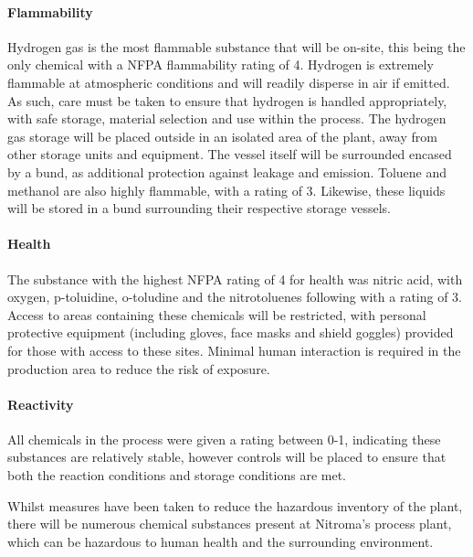 \paragraph{Flammability}

Hydrogen gas is the most flammable substance that will be on-site, this being the only chemical with a NFPA flammability rating of 4.  Hydrogen is extremely flammable at atmospheric conditions and will readily disperse in air if emitted. As such, care must be taken to ensure that hydrogen is handled appropriately, with safe storage, material selection and use within the process. The hydrogen gas storage will be placed outside in an isolated area of the plant, away from other storage units and equipment. The vessel itself will be surrounded encased by a bund, as additional protection against leakage and emission. Toluene and methanol are also highly flammable, with a rating of 3. Likewise, these liquids will be stored in a bund surrounding their respective storage vessels. 



\paragraph{Health}

The substance with the highest NFPA rating of 4 for health was nitric acid, with oxygen, p-toluidine, o-toludine and the nitrotoluenes following with a rating of 3. Access to areas containing these chemicals will be restricted, with personal protective equipment (including gloves, face masks and shield goggles) provided for those with access to these sites. Minimal human interaction is required in the production area to reduce the risk of exposure.

\paragraph{Reactivity}

All chemicals in the process were given a rating between 0-1, indicating these substances are relatively stable, however controls will be placed to ensure that both the reaction conditions and storage conditions are met. 



Whilst measures have been taken to reduce the hazardous inventory of the plant, there will be numerous chemical substances present at Nitroma's process plant, which can be hazardous to human health and the surrounding environment. 


